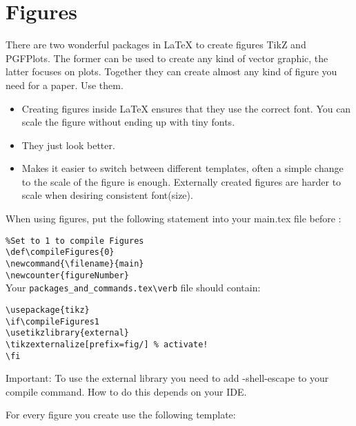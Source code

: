 \section{Figures}\label{sec:figures}
There are two wonderful packages in LaTeX to create figures TikZ and PGFPlots. The former can be used to create any kind of vector graphic, the latter focuses on plots. Together they can create almost any kind of figure you need for a paper. Use them.

\begin{whyblock}

\begin{itemize}

\item Creating figures inside LaTeX ensures that they use the correct font. You can scale the figure without ending up with tiny fonts.
\item They just look better.
\item Makes it easier to switch between different templates, often a simple change to the scale of the figure is enough. Externally created figures are harder to scale when desiring consistent font(size).
\end{itemize}
\end{whyblock}
When using figures, put the following statement into your main.tex file before
 \verb||:

\verb|%Set to 1 to compile Figures|\\
\verb|\def\compileFigures{0}|\\
\verb|\newcommand{\filename}{main}|\\
\verb|\newcounter{figureNumber}|\\

Your \verb|packages_and_commands.tex\verb| file should contain:

\verb|\usepackage{tikz}|\\
\verb|\if\compileFigures1|\\
\verb|\usetikzlibrary{external}|\\
\verb|\tikzexternalize[prefix=fig/] % activate!|\\
\verb|\fi|

Important: To use the external library you need to add -shell-escape to your compile command. How to do this depends on your IDE.

For every figure you create use the following template:

